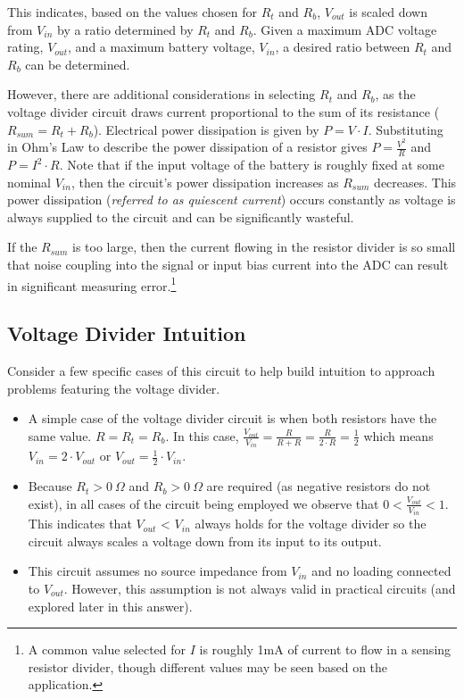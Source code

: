 \documentclass[main.tex]{subfiles}
\begin{document}
\noindent This indicates, based on the values chosen for $R_t$ and $R_b$, $V_{out}$ is scaled down from $V_{in}$ by a ratio determined by $R_t$ and $R_b$. Given a maximum ADC voltage rating, $V_{out}$, and a maximum battery voltage, $V_{in}$, a desired ratio between $R_t$ and $R_b$ can be determined. \newline

\newnoindentpara However, there are additional considerations in selecting $R_t$ and $R_b$, as the voltage divider circuit draws current proportional to the sum of its resistance ($R_{sum} = R_{t} + R_{b}$). Electrical power dissipation is given by $P = V \cdot I$. Substituting in Ohm's Law to describe the power dissipation of a resistor gives $P = \frac{V^2}{R}$ and $P = I^{2} \cdot R$. Note that if the input voltage of the battery is roughly fixed at some nominal $V_{in}$, then the circuit's power dissipation increases as $R_{sum}$ decreases. This power dissipation (\textit{referred to as quiescent current}) occurs constantly as voltage is always supplied to the circuit and can be significantly wasteful. \newline

\newnoindentpara If the $R_{sum}$ is too large, then the current flowing in the resistor divider is so small that noise coupling into the signal or input bias current into the ADC can result in significant measuring error.\footnote{A common value selected for $I$ is roughly 1mA of current to flow in a sensing resistor divider, though different values may be seen based on the application.}

\subsection{Voltage Divider Intuition}
Consider a few specific cases of this circuit to help build intuition to approach problems featuring the voltage divider.
\begin{itemize}
    \item A simple case of the voltage divider circuit is when both resistors have the same value. $R = R_t = R_b$. In this case, $\frac{V_{out}}{V_{in}} = \frac{R}{R+R} = \frac{R}{2 \cdot R} = \frac{1}{2}$ which means $V_{in} = 2 \cdot V_{out}$ or $V_{out} = \frac{1}{2} \cdot V_{in}$.
    \item Because $R_t > 0 \ \Omega$ and $R_b > 0 \ \Omega$ are required (as negative resistors do not exist), in all cases of the circuit being employed we observe that $0 < \frac{V_{out}}{V_{in}} < 1$. This indicates that $V_{out}$ < $V_{in}$ always holds for the voltage divider so the circuit always scales a voltage down from its input to its output.
    \item This circuit assumes no source impedance from $V_{in}$ and no loading connected to $V_{out}$. However, this assumption is not always valid in practical circuits (and explored later in this answer).
\end{itemize}
\end{document}
